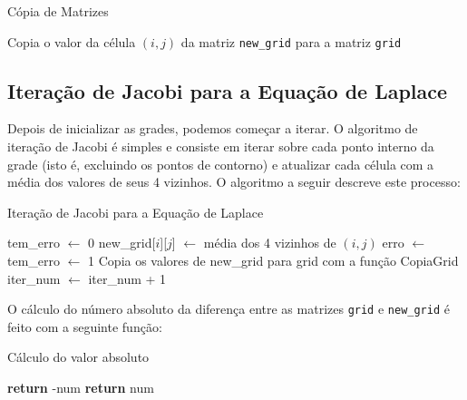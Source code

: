 \documentclass[conference]{IEEEtran}
\begin{document}
\begin{algorithm}[H]
    \caption{Cópia de Matrizes}
    \begin{algorithmic}[1]
        \State Copia o valor da célula $(i, j)$ da matriz \texttt{new\_grid} para a matriz \texttt{grid}
        \EndFor
        \EndFunction
    \end{algorithmic}
\end{algorithm}

\subsection{Iteração de Jacobi para a Equação de Laplace}

Depois de inicializar as grades, podemos começar a iterar. O algoritmo de iteração de Jacobi é simples e consiste em iterar sobre cada ponto interno da grade (isto é, excluindo os pontos de contorno) e atualizar cada célula com a média dos valores de seus 4 vizinhos. O algoritmo a seguir descreve este processo:

\begin{algorithm}[H]
    \caption{Iteração de Jacobi para a Equação de Laplace}
    \begin{algorithmic}[1]
        \State tem\_erro $\gets$ 0
        \State new\_grid[$i$][$j$] $\gets$ média dos 4 vizinhos de $(i, j)$
        \State erro $\gets$ 
        \State tem\_erro $\gets$ 1
        \EndIf
        \EndFor
        \State Copia os valores de new\_grid para grid com a função CopiaGrid
        \State iter\_num $\gets$ iter\_num + 1
        \EndWhile
    \end{algorithmic}
\end{algorithm}

O cálculo do número absoluto da diferença entre as matrizes \texttt{grid} e \texttt{new\_grid} é feito com a seguinte função:

\begin{algorithm}[H]
    \caption{Cálculo do valor absoluto}
    \begin{algorithmic}[1]
        \State \textbf{return} -num
        \Else
        \State \textbf{return} num
        \EndIf
        \EndFunction
    \end{algorithmic}
\end{algorithm}
\end{document}
